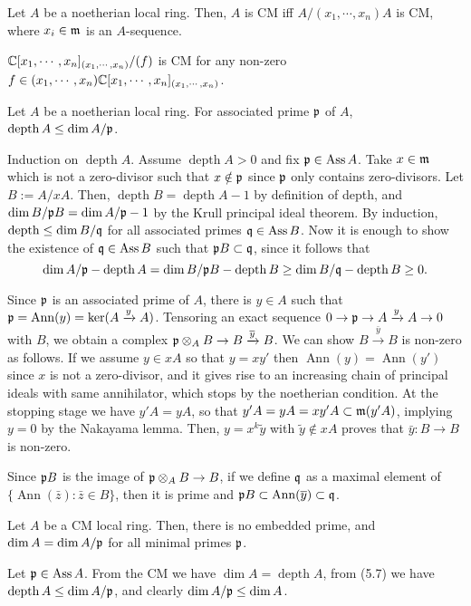 \documentclass{../../../small}
\newcommand{\depth}{\operatorname{depth}}
\newcommand{\Ass}{\operatorname{Ass}}
\newcommand{\Ann}{\operatorname{Ann}}
\begin{document}
\begin{prop*}[5.5]
Let $A$ be a noetherian local ring.
Then, $A$ is CM iff $A/(x_1,\cdots,x_n)A$ is CM, where $x_i\in\mathfrak{m}$ is an $A$-sequence.
\end{prop*}

\begin{ex*}[5.6]
$\mathbb{C}[x_1,\cdots,x_n]_{(x_1,\cdots,x_n)}/(f)$ is CM for any non-zero $f\in(x_1,\cdots,x_n)\mathbb{C}[x_1,\cdots,x_n]_{(x_1,\cdots,x_n)}$.
\end{ex*}

\begin{thm*}[5.7]
Let $A$ be a noetherian local ring.
For associated prime $\mathfrak{p}$ of $A$, $\depth A\le\dim A/\fp$.
\end{thm*}
\begin{pf}
Induction on $\depth A$.
Assume $\depth A>0$ and fix $\fp\in\Ass A$.
Take $x\in\mathfrak{m}$ which is not a zero-divisor such that $x\notin\mathfrak{p}$ since $\mathfrak{p}$ only contains zero-divisors.
Let $B:=A/xA$.
Then, $\depth B=\depth A-1$ by definition of depth, and $\dim B/\mathfrak{p} B=\dim A/\mathfrak{p}-1$ by the Krull principal ideal theorem.
By induction, $\depth\le\dim B/\fq$ for all associated primes $\fq\in\Ass B$.
Now it is enough to show the existence of $\fq\in\Ass B$ such that $\mathfrak{p} B\subset\mathfrak{q}$, since it follows that
\[\dim A/\fp-\depth A=\dim B/\fp B-\depth B\ge\dim B/\fq-\depth B\ge0.\]

Since $\mathfrak{p}$ is an associated prime of $A$, there is $y\in A$ such that $\fp=\Ann(y)=\ker(A\xrightarrow{y}A)$.
Tensoring an exact sequence $0\to\mathfrak{p}\to A\xrightarrow{y} A\to0$ with $B$, we obtain a complex $\mathfrak{p}\otimes_AB\to B\xrightarrow{\overline y}B$.
We can show $B\xrightarrow{\bar y}B$ is non-zero as follows.
If we assume $y\in xA$ so that $y=xy'$ then $\Ann(y)=\Ann(y')$ since $x$ is not a zero-divisor, and it gives rise to an increasing chain of principal ideals with same annihilator, which stops by the noetherian condition.
At the stopping stage we have $y'A=yA$, so that $y'A=yA=xy'A\subset\mathfrak{m}(y'A)$, implying $y=0$ by the Nakayama lemma.
Then, $y=x^k\tilde y$ with $\tilde y\notin xA$ proves that $\bar y:B\to B$ is non-zero.

Since $\mathfrak{p} B$ is the image of $\mathfrak{p}\otimes_AB\to B$, if we define $\mathfrak{q}$ as a maximal element of $\{\Ann(\bar z):\bar z\in B\}$, then it is prime and $\fp B\subset\Ann(\bar y)\subset \fq$.
\end{pf}

\begin{cor*}[5.8]
Let $A$ be a CM local ring.
Then, there is no embedded prime, and $\dim A=\dim A/\mathfrak{p}$ for all minimal primes $\mathfrak{p}$.
\end{cor*}
\begin{pf}
Let $\fp\in\Ass A$.
From the CM we have $\dim A=\depth A$, from (5.7) we have $\depth A\le\dim A/\fp$, and clearly $\dim A/\mathfrak{p}\le\dim A$.
\end{pf}
\end{document}
